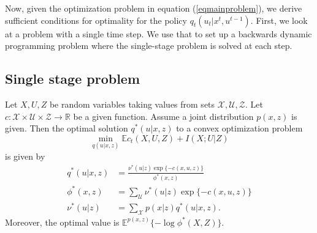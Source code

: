 Now, given the optimization problem in equation (\ref{eqmainproblem}), we derive sufficient conditions for optimality for the policy $q_t(u_t|x^t,u^{t-1})$. First, we look at a problem with a single time step. We use that to set up a backwards dynamic programming problem where the single-stage problem is solved at each step.
\vspace{-0.25cm}
\subsection{Single stage problem}

\label{secsinglestage}
Let $X, U, Z$ be random variables taking values from sets $\mathcal{X}, \mathcal{U}, \mathcal{Z}$.
Let $c:\mathcal{X}\times \mathcal{U}\times \mathcal{Z}\rightarrow \mathbb{R}$ be a given function. 
Assume a joint distribution $p(x,z)$ is given.
Then the optimal solution $q^*(u|x, z)$ to a convex optimization problem
\[
\min_{q(u|x,z)} \mathbb{E}c_t(X,U,Z)+I(X;U|Z)
\]
is given by \cite{csiszar1974extremum}
\begin{align*}
q^*(u|x,z)&=\frac{\nu^*(u|z)\exp\{-c(x,u,z)\}}{\phi^*(x,z)} \\
\phi^*(x,z)&=\sum_{\mathcal{U}} \nu^*(u|z)\exp\{-c(x,u,z)\} \\
\nu^*(u|z)&=\sum_{\mathcal{X}} p(x|z)q^*(u|x,z).
\end{align*}
Moreover, the optimal value is $\mathbb{E}^{p(x,z)}\{-\log \phi^*(X,Z)\}$.

